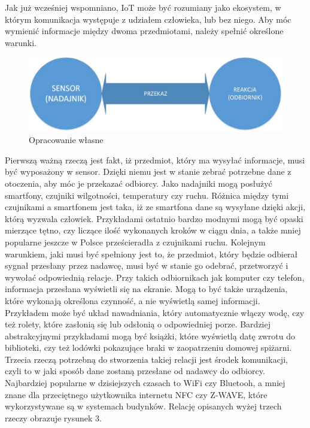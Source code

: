 \documentclass[brudnopis]{xmgr}
\begin{document}
Jak już wcześniej wspomniano, IoT może być rozumiany jako ekosystem, w którym komunikacja występuje z udziałem człowieka, lub bez niego. Aby móc wymienić informacje między dwoma przedmiotami, należy spełnić określone warunki.
\begin{figure}[h]
\centering
\includegraphics[width=12cm]{o}
\caption{Opracowanie własne}
\label{fig:opracowanie}
\end{figure} 
Pierwszą ważną rzeczą jest fakt, iż przedmiot, który ma wysyłać informacje, musi być wyposażony w sensor. Dzięki niemu jest w stanie zebrać potrzebne dane z otoczenia, aby móc je przekazać odbiorcy. Jako nadajniki mogą posłużyć smartfony, czujniki wilgotności, temperatury czy ruchu. Różnica między tymi czujnikami a smartfonem jest taka, iż ze smartfona dane są wysyłane dzięki akcji, którą wyzwala człowiek. Przykładami ostatnio bardzo modnymi mogą być opaski mierzące tętno, czy liczące ilość wykonanych kroków w ciągu dnia, a także mniej popularne jeszcze w Polsce prześcieradła z czujnikami ruchu. 
Kolejnym warunkiem, jaki musi być spełniony jest to, że przedmiot, który będzie odbierał sygnał przesłany przez nadawcę, musi być w stanie go odebrać, przetworzyć i wywołać odpowiednią relacje. Przy takich odbiornikach jak komputer czy telefon, informacja przesłana wyświetli się na ekranie. Mogą to być także urządzenia, które wykonają określona czynność, a nie wyświetlą samej informacji. Przykładem może być układ nawadniania, który automatycznie włączy wodę, czy też rolety, które zasłonią się lub odsłonią o odpowiedniej porze. Bardziej abstrakcyjnymi przykładami mogą być książki, które wyświetlą datę zwrotu do biblioteki, czy też lodówki pokazujące braki w zaopatrzeniu domowej spiżarni.  
Trzecia rzeczą potrzebną do stworzenia takiej relacji jest środek komunikacji, czyli to w jaki sposób dane zostaną przesłane od nadawcy do odbiorcy. Najbardziej popularne w dzisiejszych czasach to WiFi czy Bluetooh, a mniej znane dla przeciętnego użytkownika internetu NFC czy Z-WAVE, które wykorzystywane są w systemach budynków. 
Relację opisanych wyżej trzech rzeczy obrazuje rysunek 3.
\end{document}

